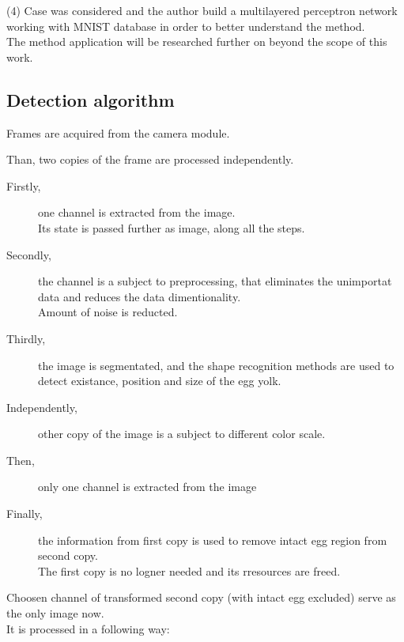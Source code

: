 \documentclass[12pt,twoside,a4paper]{article}
\begin{document}
(4) Case was considered and the author build a multilayered perceptron network working with MNIST database in order to better understand the method.\\
The method application will be researched further on beyond the scope of this work.



\subsection{Detection algorithm}

Frames are acquired from the camera module.

Than, two copies of the frame are processed independently.

\begin{description}
  \item[Firstly,]one channel is extracted from the image.\\
  Its state is passed further as image, along all the steps.
  \item[Secondly,]the channel is a subject to preprocessing, that eliminates the unimportat data and reduces the data dimentionality.\\ 
  Amount of noise is reducted.
  \item[Thirdly,]the image is segmentated, and the shape recognition methods are used to detect existance, position and size of the egg yolk.
  \item[Independently,]other copy of the image is a subject to different color scale.
  \item[Then,]only one channel is extracted from the image
  \item[Finally,]the information from first copy is used to remove intact egg region from second copy.\\The first copy is no logner needed and its rresources are freed.
\end{description}

Choosen channel of transformed second copy (with intact egg excluded) serve as the only image now.\\
It is processed in a following way:
\end{document}
